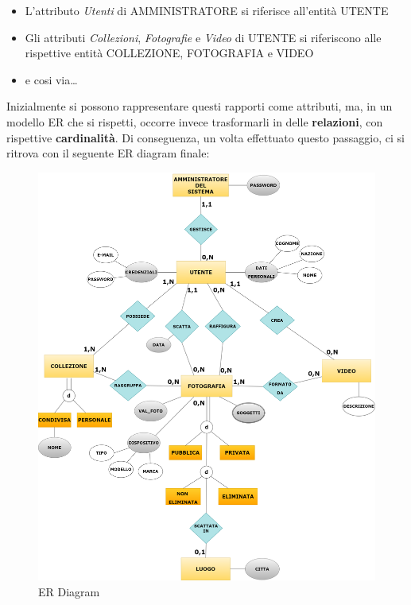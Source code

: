 \documentclass[a4paper]{article}
\begin{document}
	\begin{itemize}
		\item L'attributo \emph{Utenti} di AMMINISTRATORE si
		riferisce all'entità
		UTENTE
		\item Gli attributi \emph{Collezioni},
		\emph{Fotografie}
		e \emph{Video} di UTENTE si riferiscono alle
		rispettive
		entità COLLEZIONE, FOTOGRAFIA e VIDEO
		\item e cosi via\dots
	\end{itemize}
	
	Inizialmente si possono rappresentare questi rapporti
	come attributi, ma, in un modello ER che si rispetti,
	occorre invece trasformarli in delle
	\textbf{relazioni}, con rispettive \textbf{cardinalità}.
	Di
	conseguenza, un volta effettuato questo passaggio,
	ci si ritrova
	con il seguente ER diagram finale:
	\vspace{5pt}
	
	\begin{figure}[H]
        \begin{center}
            \includegraphics[scale=0.24]{Immagini/Galleria_Fotografica_ER}
        	\caption{ER Diagram}
        \end{center}
	\end{figure}
\end{document}
